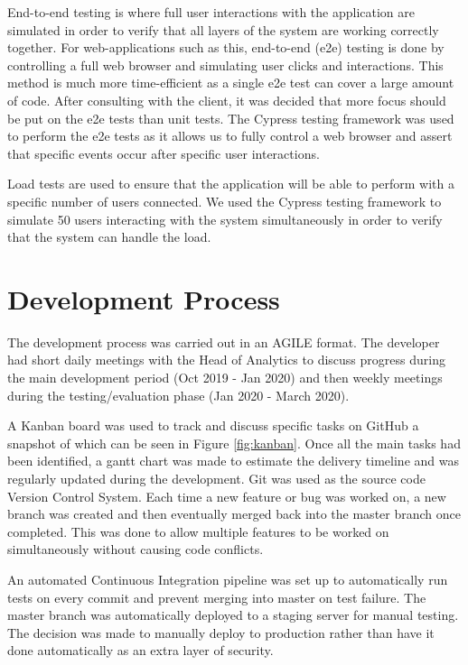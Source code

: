 \documentclass[12pt]{article}
\begin{document}
End-to-end testing is where full user interactions with the application are simulated in order to verify that all layers of the system are working correctly together. For web-applications such as this, end-to-end (e2e) testing is done by controlling a full web browser and simulating user clicks and interactions. This method is much more time-efficient as a single e2e test can cover a large amount of code. After consulting with the client, it was decided that more focus should be put on the e2e tests than unit tests. The Cypress testing framework was used to perform the e2e tests as it allows us to fully control a web browser and assert that specific events occur after specific user interactions.

Load tests are used to ensure that the application will be able to perform with a specific number of users connected. We used the Cypress testing framework to simulate 50 users interacting with the system simultaneously in order to verify that the system can handle the load.

\section{Development Process}
The development process was carried out in an AGILE format. The developer had short daily meetings with the Head of Analytics to discuss progress during the main development period (Oct 2019 - Jan 2020) and then weekly meetings during the testing/evaluation phase (Jan 2020 - March 2020).

A Kanban board was used to track and discuss specific tasks on GitHub a snapshot of which can be seen in Figure \ref{fig:kanban}. Once all the main tasks had been identified, a gantt chart was made to estimate the delivery timeline and was regularly updated during the development. Git was used as the source code Version Control System. Each time a new feature or bug was worked on, a new branch was created and then eventually merged back into the master branch once completed. This was done to allow multiple features to be worked on simultaneously without causing code conflicts.

An automated Continuous Integration pipeline was set up to automatically run tests on every commit and prevent merging into master on test failure. The master branch was automatically deployed to a staging server for manual testing. The decision was made to manually deploy to production rather than have it done automatically as an extra layer of security.
\end{document}
